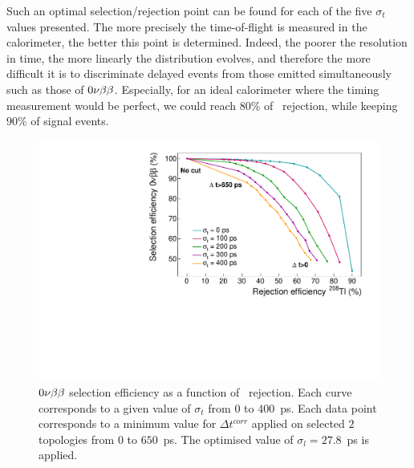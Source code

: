 Such an optimal selection/rejection point can be found for each of the five $\sigma_{t}$ values presented.
The more precisely the time-of-flight is measured in the calorimeter, the better this point is determined.
Indeed, the poorer the resolution in time, the more linearly the distribution evolves, and therefore the more difficult it is to discriminate delayed events from those emitted simultaneously such as those of $0\nu\beta\beta$.
Especially, for an ideal calorimeter where the timing measurement would be perfect, we could reach $80$\% of \Tl\ rejection, while keeping $90$\% of signal events.
\begin{figure}[!h]
  \centering
  \includegraphics[width=13cm]{timedifference/fig_timediff/compare_sigma_cut_delta_t.pdf}
  \caption{$0\nu\beta\beta$ selection efficiency as a function of \Tl\ rejection.
    Each curve corresponds to a given value of $\sigma_{t}$ from $0$ to $400$~ps.
    Each data point corresponds to a minimum value for $\Delta t^{corr}$ applied on selected $2$ topologies from $0$ to $650$~ps.
    The optimised value of $\sigma_{l}=27.8$~ps is applied.
    \label{fig:eff_cut_delta_t_sigma}}
\end{figure}

